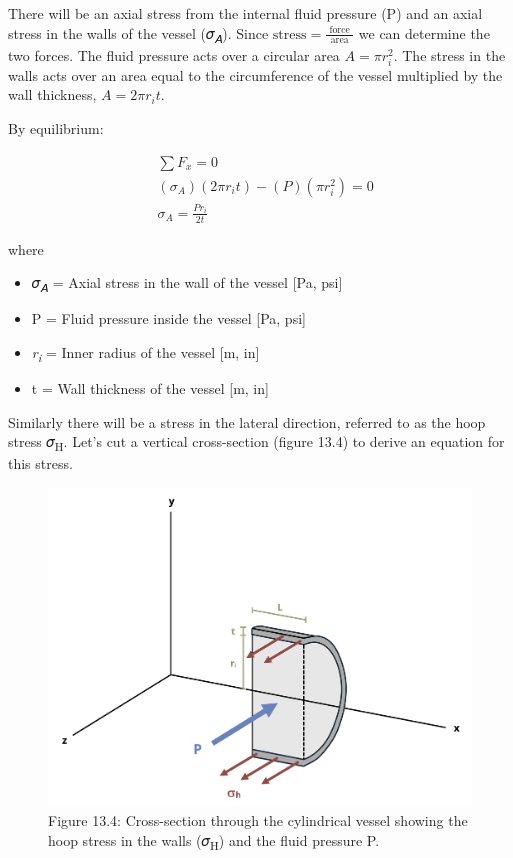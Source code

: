 \documentclass[
  letterpaper,
  DIV=11,
  numbers=noendperiod]{scrreprt}
\begin{document}
There will be an axial stress from the internal fluid pressure (P) and
an axial stress in the walls of the vessel (𝜎\textsubscript{𝐴}). Since
\(\text{stress}=\frac{\text { force }}{\text { area }}\) we can
determine the two forces. The fluid pressure acts over a circular area
\(A=\pi r_i^2\). The stress in the walls acts over an area equal to the
circumference of the vessel multiplied by the wall thickness,
\(A=2 \pi r_i t\).

By equilibrium:

\[
\begin{aligned}
& \sum F_x=0 \\
& \left(\sigma_A\right)\left(2 \pi r_i t\right)-(P)\left(\pi r_i^2\right)=0 \\
& \sigma_A=\frac{P r_i}{2 t}
\end{aligned}
\]

where

\begin{itemize}
\item
  𝜎\textsubscript{𝐴} = Axial stress in the wall of the vessel {[}Pa,
  psi{]}
\item
  P = Fluid pressure inside the vessel {[}Pa, psi{]}
\item
  \emph{r\textsubscript{i}} = Inner radius of the vessel {[}m, in{]}
\item
  t = Wall thickness of the vessel {[}m, in{]}
\end{itemize}

Similarly there will be a stress in the lateral direction, referred to
as the hoop stress 𝜎\textsubscript{H}. Let's cut a vertical
cross-section (figure 13.4) to derive an equation for this stress.

\begin{figure}[H]

{\centering \includegraphics[width=5.30208in,height=\textheight]{images/CH13 PNGs/figure 13.4.png}

}

\caption{Figure 13.4: Cross-section through the cylindrical vessel
showing the hoop stress in the walls (𝜎\textsubscript{H}) and the fluid
pressure P.}

\end{figure}%
\end{document}
